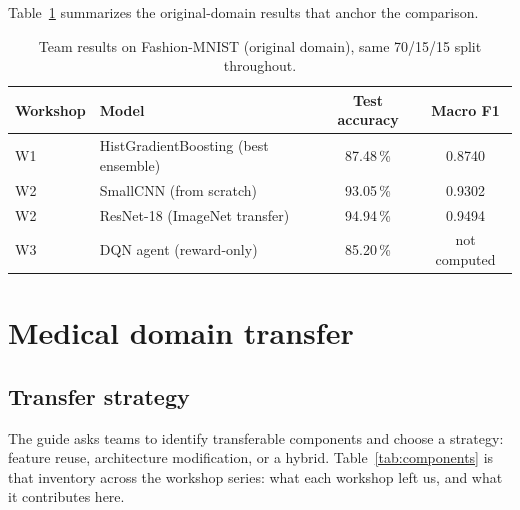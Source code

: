 \documentclass[11pt,a4paper]{article}
\begin{document}
Table~\ref{tab:original} summarizes the original-domain results that anchor the comparison.

\begin{table}[h]
\centering
\caption{Team results on Fashion-MNIST (original domain), same 70/15/15 split throughout.}
\label{tab:original}
\begin{tabular}{llcc}
\toprule
Workshop & Model & Test accuracy & Macro F1 \\
\midrule
W1 & HistGradientBoosting (best ensemble) & 87.48\,\% & 0.8740 \\
W2 & SmallCNN (from scratch) & 93.05\,\% & 0.9302 \\
W2 & ResNet-18 (ImageNet transfer) & 94.94\,\% & 0.9494 \\
W3 & DQN agent (reward-only) & 85.20\,\% & not computed \\
\bottomrule
\end{tabular}
\end{table}

\section{Medical domain transfer}

\subsection{Transfer strategy}

The guide asks teams to identify transferable components and choose a strategy: feature reuse, architecture modification, or a hybrid. Table~\ref{tab:components} is that inventory across the workshop series: what each workshop left us, and what it contributes here.
\end{document}
